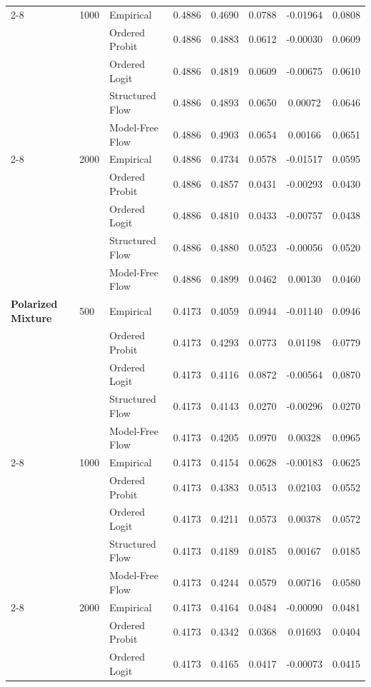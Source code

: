 \documentclass{article}
\numberwithin{figure}{section}
\numberwithin{table}{section}
\numberwithin{equation}{section}
\begin{document}
\begin{table}[ht]
\begin{tabular}{lllccccc}
\cline{2-8}
 & 1000 & Empirical & 0.4886 & 0.4690 & 0.0788 & -0.01964 & 0.0808 \\
 &  & Ordered Probit & 0.4886 & 0.4883 & 0.0612 & -0.00030 & 0.0609 \\
 &  & Ordered Logit & 0.4886 & 0.4819 & 0.0609 & -0.00675 & 0.0610 \\
 &  & Structured Flow & 0.4886 & 0.4893 & 0.0650 & 0.00072 & 0.0646 \\
 &  & Model-Free Flow & 0.4886 & 0.4903 & 0.0654 & 0.00166 & 0.0651 \\
\cline{2-8}
 & 2000 & Empirical & 0.4886 & 0.4734 & 0.0578 & -0.01517 & 0.0595 \\
 &  & Ordered Probit & 0.4886 & 0.4857 & 0.0431 & -0.00293 & 0.0430 \\
 &  & Ordered Logit & 0.4886 & 0.4810 & 0.0433 & -0.00757 & 0.0438 \\
 &  & Structured Flow & 0.4886 & 0.4880 & 0.0523 & -0.00056 & 0.0520 \\
 &  & Model-Free Flow & 0.4886 & 0.4899 & 0.0462 & 0.00130 & 0.0460 \\
\midrule
\textbf{Polarized Mixture} & 500 & Empirical & 0.4173 & 0.4059 & 0.0944 & -0.01140 & 0.0946 \\
 &  & Ordered Probit & 0.4173 & 0.4293 & 0.0773 & 0.01198 & 0.0779 \\
 &  & Ordered Logit & 0.4173 & 0.4116 & 0.0872 & -0.00564 & 0.0870 \\
 &  & Structured Flow & 0.4173 & 0.4143 & 0.0270 & -0.00296 & 0.0270 \\
 &  & Model-Free Flow & 0.4173 & 0.4205 & 0.0970 & 0.00328 & 0.0965 \\
\cline{2-8}
 & 1000 & Empirical & 0.4173 & 0.4154 & 0.0628 & -0.00183 & 0.0625 \\
 &  & Ordered Probit & 0.4173 & 0.4383 & 0.0513 & 0.02103 & 0.0552 \\
 &  & Ordered Logit & 0.4173 & 0.4211 & 0.0573 & 0.00378 & 0.0572 \\
 &  & Structured Flow & 0.4173 & 0.4189 & 0.0185 & 0.00167 & 0.0185 \\
 &  & Model-Free Flow & 0.4173 & 0.4244 & 0.0579 & 0.00716 & 0.0580 \\
\cline{2-8}
 & 2000 & Empirical & 0.4173 & 0.4164 & 0.0484 & -0.00090 & 0.0481 \\
 &  & Ordered Probit & 0.4173 & 0.4342 & 0.0368 & 0.01693 & 0.0404 \\
 &  & Ordered Logit & 0.4173 & 0.4165 & 0.0417 & -0.00073 & 0.0415 \\

\end{tabular}
\end{table}
\end{document}
